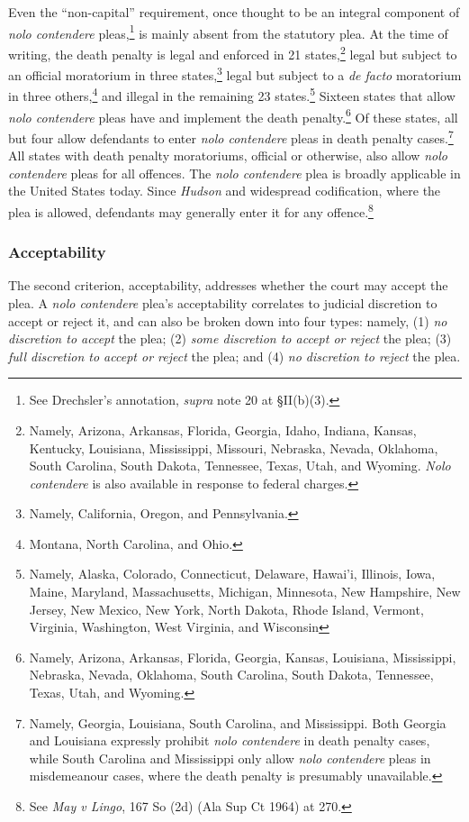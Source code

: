 Even the ``non-capital'' requirement, once thought to be an integral component of \textit{nolo contendere} pleas,\footnote{See Drechsler's annotation, \textit{supra} note 20 at \S II(b)(3).} is mainly absent from the statutory plea. At the time of writing, the death penalty is legal and enforced in 21 states,\footnote{Namely, Arizona, Arkansas, Florida, Georgia, Idaho, Indiana, Kansas, Kentucky, Louisiana, Mississippi, Missouri, Nebraska, Nevada, Oklahoma, South Carolina, South Dakota, Tennessee, Texas, Utah, and Wyoming. \textit{Nolo contendere} is also available in response to federal charges.} legal but subject to an official moratorium in three states,\footnote{Namely, California, Oregon, and Pennsylvania.} legal but subject to a \textit{de facto} moratorium in three others,\footnote{Montana, North Carolina, and Ohio.} and illegal in the remaining 23 states.\footnote{Namely, Alaska, Colorado, Connecticut, Delaware, Hawai'i, Illinois, Iowa, Maine, Maryland, Massachusetts, Michigan, Minnesota, New Hampshire, New Jersey, New Mexico, New York, North Dakota, Rhode Island, Vermont, Virginia, Washington, West Virginia, and Wisconsin} Sixteen states that allow \textit{nolo contendere} pleas have and implement the death penalty.\footnote{Namely, Arizona, Arkansas, Florida, Georgia, Kansas, Louisiana, Mississippi, Nebraska, Nevada, Oklahoma, South Carolina, South Dakota, Tennessee, Texas, Utah, and Wyoming.}  Of these states, all but four allow defendants to enter \textit{nolo contendere} pleas in death penalty cases.\footnote{Namely, Georgia, Louisiana, South Carolina, and Mississippi. Both Georgia and Louisiana expressly prohibit \textit{nolo contendere} in death penalty cases, while South Carolina and Mississippi only allow \textit{nolo contendere} pleas in misdemeanour cases, where the death penalty is presumably unavailable.} All states with death penalty moratoriums, official or otherwise, also allow \textit{nolo contendere} pleas for all offences. The \textit{nolo contendere} plea is broadly applicable in the United States today. Since \textit{Hudson} and widespread codification, where the plea is allowed, defendants may generally enter it for any offence.\footnote{See \textit{May v Lingo}, 167 So (2d) (Ala Sup Ct 1964) at 270.}

\subsubsection{Acceptability}

The second criterion, acceptability, addresses whether the court may accept the plea. A \textit{nolo contendere} plea's acceptability correlates to judicial discretion to accept or reject it, and can also be broken down into four types: namely, (1) \textit{no discretion to accept} the plea; (2) \textit{some discretion to accept or reject} the plea; (3) \textit{full discretion to accept or reject} the plea; and (4) \textit{no discretion to reject} the plea.

